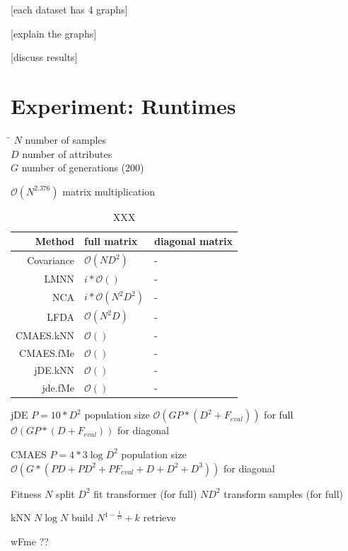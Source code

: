 \documentclass[12pt,a4paper]{report}
\begin{document}
[each dataset has 4 graphs] %

[explain the graphs] %

[discuss results] %


\section{Experiment: Runtimes}

\begin{tabbing}
\hspace{50pt}\=\kill
$N$ \> number of samples \\
$D$ \> number of attributes \\ 
$G$ \> number of generations (200) \\
\end{tabbing} 

$\mathcal{O}(N^{2.376})$ matrix multiplication 

\begin{table}[ht] \centering
\begin{tabular}{rll}
\hline
Method & full matrix & diagonal matrix \\
\hline
Covariance & $\mathcal{O}(ND^2)$ & - \\
LMNN & $i*\mathcal{O}()$ & - \\
NCA & $i*\mathcal{O}(N^2D^2)$ & - \\
LFDA & $\mathcal{O}(N^2D)$ & - \\
CMAES.kNN & $\mathcal{O}()$ & - \\
CMAES.fMe & $\mathcal{O}()$ & - \\
jDE.kNN & $\mathcal{O}()$ & - \\
jde.fMe & $\mathcal{O}()$ & - \\ 
\hline
\end{tabular}
\caption{XXX} \label{tab:XXX}
\end{table}


jDE
$P=10*D^2$ population size
$\mathcal{O}(GP*(D^2+F_{eval}))$ for full
$\mathcal{O}(GP*(D+F_{eval}))$ for diagonal

CMAES
$P=4*3\log{D^2}$ population size
$\mathcal{O}(G*(PD+PD^2+PF_{eval}+D+D^2+D^3))$ for diagonal

Fitness
$N$ split
$D^2$ fit transformer (for full)
$ND^2$ transform samples (for full)

kNN
$N\log{N}$ build
$N^{1-\frac{1}{D}}+k$ retrieve

wFme ??

\end{document}
